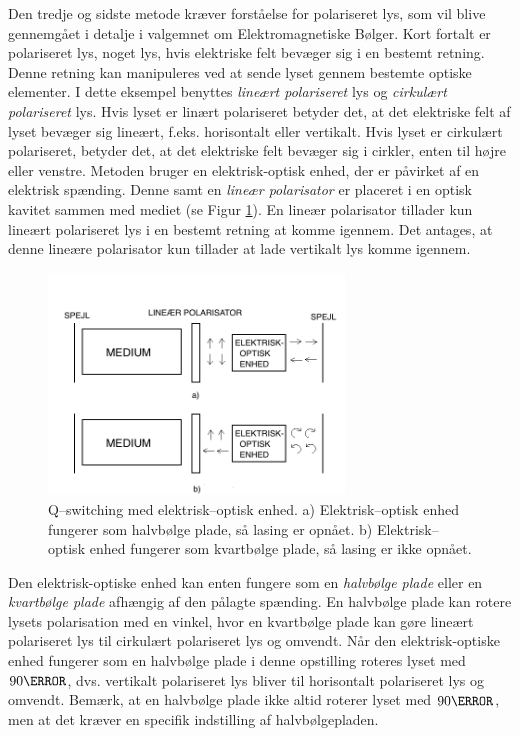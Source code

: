 Den tredje og sidste metode kræver forståelse for polariseret lys, som vil blive gennemgået i detalje i valgemnet om Elektromagnetiske Bølger. Kort fortalt er polariseret lys, noget lys, hvis elektriske felt bevæger sig i en bestemt retning. Denne retning kan manipuleres ved at sende lyset gennem bestemte optiske elementer. I dette eksempel benyttes \emph{lineært polariseret} lys og \emph{cirkulært polariseret} lys. Hvis lyset er linært polariseret betyder det, at det elektriske felt af lyset bevæger sig lineært, f.eks. horisontalt eller vertikalt. Hvis lyset er cirkulært polariseret, betyder det, at det elektriske felt bevæger sig i cirkler, enten til højre eller venstre. 
Metoden bruger en elektrisk-optisk enhed, der er påvirket af en elektrisk spænding. Denne samt en \emph{lineær polarisator} er placeret i en optisk kavitet sammen med mediet (se Figur \ref{fig:elektriskoptisk}). En lineær polarisator tillader kun lineært polariseret lys i en bestemt retning at komme igennem. Det antages, at denne lineære polarisator kun tillader at lade vertikalt lys komme igennem. 

\begin{figure}[h!]
  \centering
  \includegraphics[width=0.7\textwidth]{Laserfysik/elektriskoptisk.png}
  \caption{Q--switching med elektrisk--optisk enhed. a) Elektrisk--optisk enhed fungerer som halvbølge plade, så lasing er opnået. b) Elektrisk--optisk enhed fungerer som kvartbølge plade, så lasing er ikke opnået.}
  \label{fig:elektriskoptisk}
\end{figure}

Den elektrisk-optiske enhed kan enten fungere som en \emph{halvbølge plade} eller en \emph{kvartbølge plade} afhængig af den pålagte spænding. En halvbølge plade kan rotere lysets polarisation med en vinkel, hvor en kvartbølge plade kan gøre lineært polariseret lys til cirkulært polariseret lys og omvendt. 
Når den elektrisk-optiske enhed fungerer som en halvbølge plade i denne opstilling roteres lyset med $90\degree$, dvs. vertikalt polariseret lys bliver til horisontalt polariseret lys og omvendt. Bemærk, at en halvbølge plade ikke altid roterer lyset med $90\degree$, men at det kræver en specifik indstilling af halvbølgepladen. 

